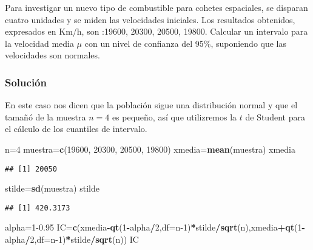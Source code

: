 \documentclass[
]{article}
\newenvironment{Shaded}{\begin{snugshade}}{\end{snugshade}}
\newcommand{\DataTypeTok}[1]{\textcolor[rgb]{0.13,0.29,0.53}{#1}}
\newcommand{\DecValTok}[1]{\textcolor[rgb]{0.00,0.00,0.81}{#1}}
\newcommand{\FloatTok}[1]{\textcolor[rgb]{0.00,0.00,0.81}{#1}}
\newcommand{\KeywordTok}[1]{\textcolor[rgb]{0.13,0.29,0.53}{\textbf{#1}}}
\newcommand{\NormalTok}[1]{#1}
\newcommand{\OperatorTok}[1]{\textcolor[rgb]{0.81,0.36,0.00}{\textbf{#1}}}
\begin{document}
Para investigar un nuevo tipo de combustible para cohetes espaciales, se
disparan cuatro unidades y se miden las velocidades iniciales. Los
resultados obtenidos, expresados en Km/h, son :19600, 20300, 20500,
19800. Calcular un intervalo para la velocidad media \(\mu\) con un
nivel de confianza del 95\%, suponiendo que las velocidades son
normales.

\hypertarget{soluciuxf3n-2}{%
\subsubsection{Solución}\label{soluciuxf3n-2}}

En este caso nos dicen que la población sigue una distribución normal y
que el tamañó de la muestra \(n=4\) es pequeño, así que utilizremos la
\(t\) de Student para el cálculo de los cuantiles de intervalo.

\begin{Shaded}
\begin{Highlighting}[]
\NormalTok{n=}\DecValTok{4}
\NormalTok{muestra=}\KeywordTok{c}\NormalTok{(}\DecValTok{19600}\NormalTok{, }\DecValTok{20300}\NormalTok{, }\DecValTok{20500}\NormalTok{, }\DecValTok{19800}\NormalTok{)}
\NormalTok{xmedia=}\KeywordTok{mean}\NormalTok{(muestra)}
\NormalTok{xmedia}
\end{Highlighting}
\end{Shaded}

\begin{verbatim}
## [1] 20050
\end{verbatim}

\begin{Shaded}
\begin{Highlighting}[]
\NormalTok{stilde=}\KeywordTok{sd}\NormalTok{(muestra)}
\NormalTok{stilde}
\end{Highlighting}
\end{Shaded}

\begin{verbatim}
## [1] 420.3173
\end{verbatim}

\begin{Shaded}
\begin{Highlighting}[]
\NormalTok{alpha=}\DecValTok{1}\FloatTok{{-}0.95}
\NormalTok{IC=}\KeywordTok{c}\NormalTok{(xmedia}\OperatorTok{{-}}\KeywordTok{qt}\NormalTok{(}\DecValTok{1}\OperatorTok{{-}}\NormalTok{alpha}\OperatorTok{/}\DecValTok{2}\NormalTok{,}\DataTypeTok{df=}\NormalTok{n}\DecValTok{{-}1}\NormalTok{)}\OperatorTok{*}\NormalTok{stilde}\OperatorTok{/}\KeywordTok{sqrt}\NormalTok{(n),xmedia}\OperatorTok{+}\KeywordTok{qt}\NormalTok{(}\DecValTok{1}\OperatorTok{{-}}\NormalTok{alpha}\OperatorTok{/}\DecValTok{2}\NormalTok{,}\DataTypeTok{df=}\NormalTok{n}\DecValTok{{-}1}\NormalTok{)}\OperatorTok{*}\NormalTok{stilde}\OperatorTok{/}\KeywordTok{sqrt}\NormalTok{(n))}
\NormalTok{IC}
\end{Highlighting}
\end{Shaded}
\end{document}
